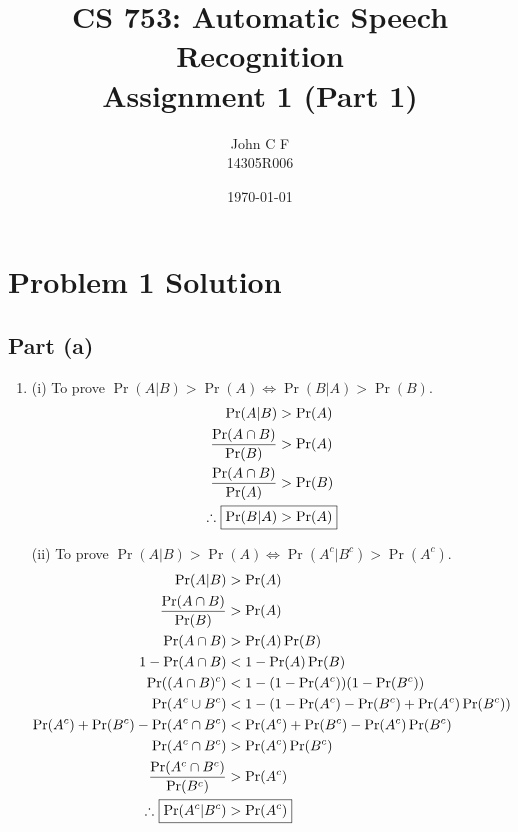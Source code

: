 \documentclass[11pt,a4paper,titlepage]{article}
\title{\blue CS 753: Automatic Speech Recognition \\ \blueb Assignment 1 (Part 1)}
\author{John C F \\ \small 14305R006}
\date{\today}
\begin{document}
\maketitle
\newpage


\section{Problem 1 Solution}
\subsection*{Part (a)}

\addtolength{\jot}{0.25em}
\begin{enumerate}
    \item (i) To prove $\Pr(A | B) > \Pr(A) \iff \Pr(B | A) > \Pr(B)$.
        \begin{align*}
            \Pr(A | B) &> \Pr(A) \\
            \frac{\Pr(A \cap B)}{\Pr(B)} &> \Pr(A) \\
            \frac{\Pr(A \cap B)}{\Pr(A)} &> \Pr(B) \\
            \therefore~\Aboxed{\Pr(B | A) &> \Pr(A)}
        \end{align*}

        (ii) To prove $\Pr(A | B) > \Pr(A) \iff \Pr(A^c | B^c) > \Pr(A^c)$.
        \begin{align*}
            \Pr(A | B) &> \Pr(A) \\
            \frac{\Pr(A \cap B)}{\Pr(B)} &> \Pr(A) \\
            \Pr(A \cap B) &> \Pr(A) \Pr(B) \\
            1 - \Pr(A \cap B) &< 1 - \Pr(A) \Pr(B) \\
            \Pr((A \cap B)^c) &< 1 - (1 - \Pr(A^c)) (1 - \Pr(B^c)) \\
            \Pr(A^c \cup B^c) &< 1 - (1 - \Pr(A^c) - \Pr(B^c) + \Pr(A^c) \Pr(B^c)) \\
            \Pr(A^c) + \Pr(B^c) - \Pr(A^c \cap B^c) &< \Pr(A^c) + \Pr(B^c) - \Pr(A^c) \Pr(B^c) \\
            \Pr(A^c \cap B^c) &> \Pr(A^c) \Pr(B^c) \\
            \frac{\Pr(A^c \cap B^c)}{\Pr(B^c)} &> \Pr(A^c) \\
            \therefore~\Aboxed{\Pr(A^c | B^c) &> \Pr(A^c)}
        \end{align*}


\end{enumerate}
\end{document}
